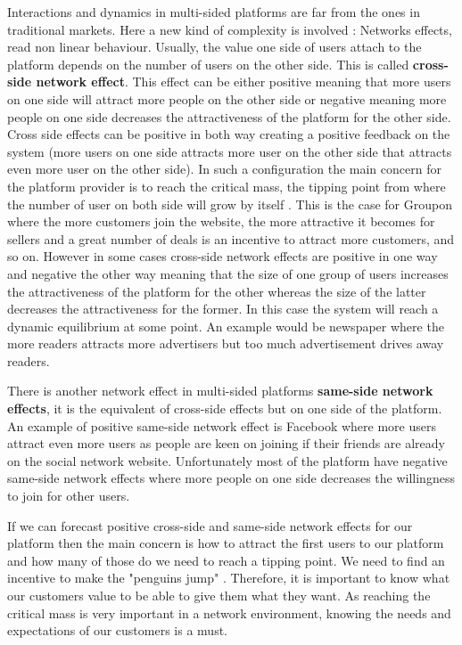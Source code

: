 \documentclass[10pt]{report}
\begin{document}
Interactions and dynamics in multi-sided platforms are far from the ones in traditional markets. Here a new kind of complexity is involved : Networks effects, read non linear behaviour. Usually, the value one side of users attach to the platform depends on the number of users on the other side. This is called \textbf{cross-side network effect}. This effect can be either positive meaning that more users on one side will attract more people on the other side or negative meaning more people on one side decreases the attractiveness of the platform for the other side. Cross side effects can be positive in both way creating a positive feedback on the system (more users on one side attracts more user on the other side that attracts even more user on the other side). In such a configuration the main concern for the platform provider is to reach the critical mass, the tipping point from where the number of user on both side will grow by itself \autocite{eisenmann2006strategies}. This is the case for Groupon where the more customers join the website, the more attractive it becomes for sellers and a great number of deals is an incentive to attract more customers, and so on. However in some cases cross-side network effects are positive in one way and negative the other way meaning that the size of one group of users increases the attractiveness of the platform for the other whereas the size of the latter decreases the attractiveness for the former. In this case the system will reach a dynamic equilibrium at some point. An example would be newspaper where the more readers attracts more advertisers but too much advertisement drives away readers. \autocite{ParkerA05}

There is another network effect in multi-sided platforms \textbf{same-side network effects}, it is the equivalent of cross-side effects but on one side of the platform. An example of positive same-side network effect is Facebook where more users attract even more users as people are keen on joining if their friends are already on the social network website. Unfortunately most of the platform have negative same-side network effects where more people on one side decreases the willingness to join for other users.

If we can forecast positive cross-side and same-side network effects for our platform then the main concern is how to attract the first users to our platform and how many of those do we need to reach a tipping point. We need to find an incentive to make the "penguins jump" \autocite{coursKyle}. Therefore, it is important to know what our customers value to be able to give them what they want. As reaching the critical mass is very important in a network environment, knowing the needs and expectations of our customers is a must. 
\end{document}
